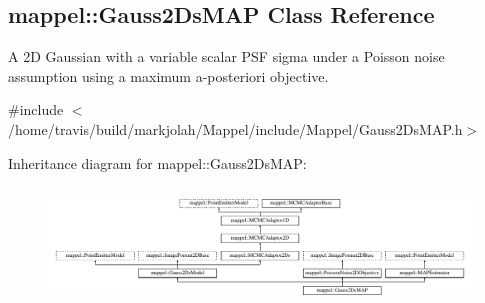 \hypertarget{classmappel_1_1Gauss2DsMAP}{}\subsection{mappel\+:\+:Gauss2\+Ds\+M\+AP Class Reference}
\label{classmappel_1_1Gauss2DsMAP}


A 2D Gaussian with a variable scalar P\+SF sigma under a Poisson noise assumption using a maximum a-\/posteriori objective.  




{\ttfamily \#include $<$/home/travis/build/markjolah/\+Mappel/include/\+Mappel/\+Gauss2\+Ds\+M\+A\+P.\+h$>$}

Inheritance diagram for mappel\+:\+:Gauss2\+Ds\+M\+AP\+:\begin{figure}[H]
\begin{center}
\leavevmode
\includegraphics[height=3.169811cm]{classmappel_1_1Gauss2DsMAP}
\end{center}
\end{figure}
